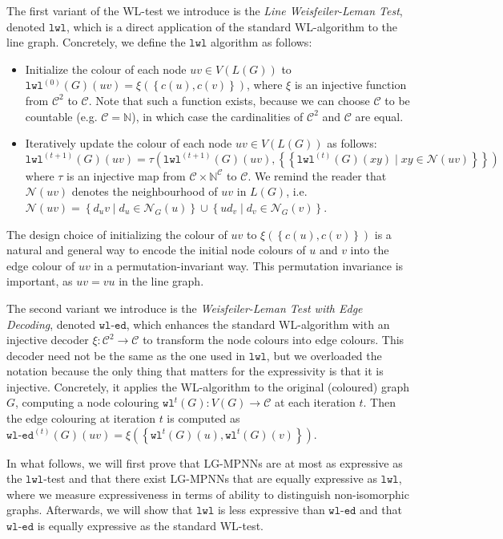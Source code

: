 \documentclass{article}
\newcommand{\set}[1]{\left\{#1\right\}}
\newcommand{\multiset}[1]{\left\{\!\!\left\{#1\right\}\!\!\right\}}
\newcommand{\iter}[1]{^{(#1)}}
\newcommand{\wl}{\texttt{wl}}
\newcommand{\wledge}{\texttt{wl-ed}}
\newcommand{\lwl}{\texttt{lwl}}
\newcommand{\dec}{\xi}
\newcommand{\hash}{\tau}
\newcommand{\nbh}{\mathcal{N}}
\newcommand{\mcc}{\mathcal{C}}
\newcommand{\mbn}{\mathbb{N}}
\begin{document}
The first variant of the WL-test we introduce is the \emph{Line Weisfeiler-Leman Test}, denoted $\lwl$, which is a direct application of the standard WL-algorithm to the line graph. Concretely, we define the $\lwl$ algorithm as follows:
\begin{itemize}
    \item Initialize the colour of each node $uv \in V(L(G))$ to $\lwl\iter{0}(G)(uv) = \dec(\set{c(u),c(v)})$, where $\dec$ is an injective function from $\mcc^2$ to $\mcc$. Note that such a function exists, because we can choose $\mcc$ to be countable (e.g. $\mcc = \mbn$), in which case the cardinalities of $\mcc^2$ and $\mcc$ are equal.
    \item Iteratively update the colour of each node $uv \in V(L(G))$ as follows:
    \begin{equation}
        \lwl\iter{t+1}(G)(uv) = \hash\left(\lwl\iter{t+1}(G)(uv), \multiset{\lwl\iter{t}(G)(xy) \mid xy \in \nbh(uv)}\right)
    \end{equation}
    where $\hash$ is an injective map from $\mcc\times\mbn^\mcc$ to $\mcc$. We remind the reader that $\nbh(uv)$ denotes the neighbourhood of $uv$ in $L(G)$, i.e. $\nbh(uv) = \set{d_uv \mid d_u \in \nbh_G(u)} \cup \set{ud_v \mid d_v \in \nbh_G(v)}$.
\end{itemize}
The design choice of initializing the colour of $uv$ to $\dec(\set{c(u),c(v)})$ is a natural and general way to encode the initial node colours of $u$ and $v$ into the edge colour of $uv$ in a permutation-invariant way. This permutation invariance is important, as $uv=vu$ in the line graph.


The second variant we introduce is the \emph{Weisfeiler-Leman Test with Edge Decoding}, denoted $\wledge$, which enhances the standard WL-algorithm with an injective decoder $\dec: \mcc^2\rightarrow\mcc$ to transform the node colours into edge colours. 
This decoder need not be the same as the one used in $\lwl$, but we overloaded the notation because the only thing that matters for the expressivity is that it is injective.
Concretely, it applies the WL-algorithm to the original (coloured) graph $G$, computing a node colouring $\wl^t(G): V(G) \rightarrow \mcc$ at each iteration $t$. Then the edge colouring at iteration $t$ is computed as $\wledge\iter{t}(G)(uv) = \dec(\set{\wl^t(G)(u),\wl^t(G)(v)})$.


In what follows, we will first prove that LG-MPNNs are at most as expressive as the $\lwl$-test and that there exist LG-MPNNs that are equally expressive as $\lwl$, where we measure expressiveness in terms of ability to distinguish non-isomorphic graphs.
Afterwards, we will show that $\lwl$ is less expressive than $\wledge$ and that $\wledge$ is equally expressive as the standard WL-test.
\end{document}
